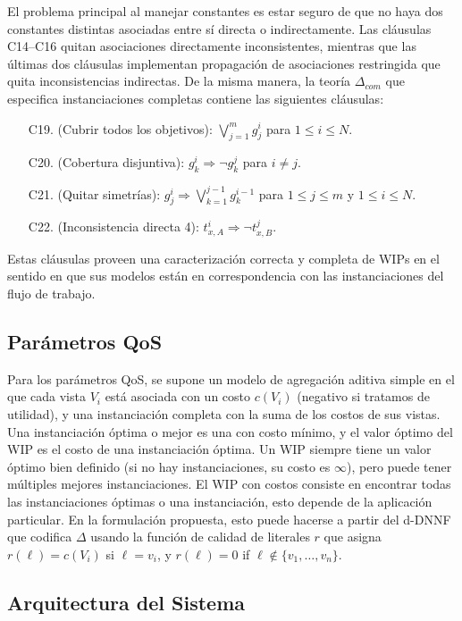 El problema principal al manejar constantes es estar seguro de que no haya dos
constantes distintas asociadas entre sí directa o indirectamente. Las cláusulas
C14--C16 quitan asociaciones directamente inconsistentes, mientras que las
últimas dos cláusulas implementan propagación de asociaciones restringida que
quita inconsistencias indirectas.
De la misma manera, la teoría $\Delta_{com}$ que especifica instanciaciones
completas contiene las siguientes cláusulas:

\begin{enumerate}[C10.]
\item[C19.] (Cubrir todos los objetivos): $\bigvee_{j=1}^m g^i_j$ para $1\leq i\leq N$.
\item[C20.] (Cobertura disjuntiva): $g^i_k \Rightarrow \neg g^j_k$ para $i\neq j$.
\item[C21.] (Quitar simetrías): $g^i_j \Rightarrow \bigvee_{k=1}^{j-1} g^{i-1}_k$
            para $1\leq j\leq m$ y $1\leq i\leq N$.
\item[C22.] (Inconsistencia directa 4): $t^i_{x,A} \Rightarrow \neg t^j_{x,B}$.
\end{enumerate}

Estas cláusulas proveen una caracterización correcta y completa de WIPs en el
sentido en que sus modelos están en correspondencia con las instanciaciones del
flujo de trabajo.

\subsection{Parámetros QoS}

Para los parámetros QoS, se supone un modelo de agregación aditiva simple en el
que cada vista
$V_i$ está asociada con un costo $c(V_i)$ (negativo si tratamos de utilidad),
y una instanciación completa con la suma de los costos de sus vistas.
Una instanciación óptima o mejor es una con costo mínimo, y el valor óptimo del
WIP es el costo de una instanciación óptima.
Un WIP siempre tiene un valor óptimo bien definido (si no hay instanciaciones,
su costo es $\infty$), pero puede tener múltiples mejores instanciaciones.
El WIP con costos consiste en encontrar todas las instanciaciones óptimas o una
instanciación, esto depende de la aplicación particular.
En la formulación propuesta, esto puede hacerse a partir del d-DNNF que codifica
$\Delta$
usando la función de calidad de literales $r$ que asigna
$r(\ell)=c(V_i)$ si
$\ell=v_i$, y $r(\ell)=0$ if $\ell\notin\{v_1,\ldots,v_n\}$.

\subsection{Arquitectura del Sistema}

